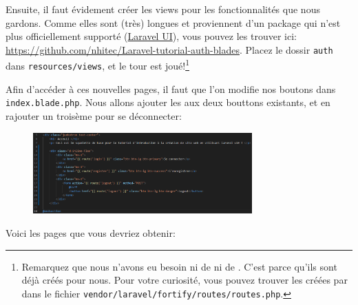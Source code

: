 Ensuite, il faut évidement créer les views pour les fonctionnalités que nous gardons. Comme elles sont (très) longues et proviennent d'un package qui n'est plus officiellement supporté (\href{https://github.com/laravel/ui}{Laravel UI}), vous pouvez les trouver ici: \url{https://github.com/nhitec/Laravel-tutorial-auth-blades}. Placez le dossir \verb|auth| dans \verb|resources/views|, et le tour est joué!\footnote{Remarquez que nous n'avons eu besoin ni de \controllers{} ni de \routes{}. C'est parce qu'ils sont déjà créés pour nous. Pour votre curiosité, vous pouvez trouver les \routes{} créées par \fortify{} dans le fichier \verb|vendor/laravel/fortify/routes/routes.php|.}

Afin d'accéder à ces nouvelles pages, il faut que l'on modifie nos boutons dans \verb|index.blade.php|. Nous allons ajouter les \routes{} aux deux bouttons existants, et en rajouter un troisème pour se déconnecter:

\begin{figure}[!h]
    \centering
    \includegraphics[width=0.75\textwidth]{figures-C1/index_auth.pdf}
    \caption{}
\end{figure}

\newpage

Voici les pages que vous devriez obtenir:

